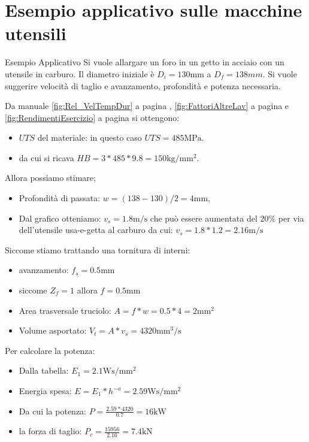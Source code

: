 
\chapter{Esempio applicativo sulle macchine utensili}
\label{exe:EsempioApplicativo}

\begin{example}{Esempio Applicativo}
Si vuole allargare un foro in un getto in acciaio con un utensile in carburo. Il diametro iniziale è $D_i = 130\unit{\mm}$ a $D_f = 138\unit{mm}$. Si vuole suggerire velocità di taglio e avanzamento, profondità e potenza necessaria.

Da manuale \eqref{fig:Rel_VelTempDur} a pagina \pageref{fig:Rel_VelTempDur}, \eqref{fig:FattoriAltreLav} a pagina \pageref{fig:FattoriAltreLav} e \eqref{fig:RendimentiEsercizio}  a pagina \pageref{fig:RendimentiEsercizio} si ottengono: 
\begin{itemize}
\item $UTS$ del materiale: in questo caso $UTS = 485\unit{\MPa}$.
\item da cui si ricava $HB = 3*485*9.8=150\unit{\kg/\mm^2}$.
\end{itemize}
Allora possiamo stimare;
\begin{itemize}
\item Profondità di passata: $w = (138-130)/2 = 4\unit{\mm}$,
\item Dal grafico otteniamo: $v_s = 1.8\unit{\m/\s}$ che può essere aumentata del 20\% per via dell'utensile usa-e-getta al carburo da cui: $v_s = 1.8 * 1.2 = 2.16\unit{\m/\s}$
\end{itemize}
Siccome stiamo trattando una tornitura di interni:
\begin{itemize}
\item avanzamento: $f_s = 0.5\unit{\mm}$
\item siccome $Z_f = 1$ allora $f = 0.5\unit{\mm}$
\item Area trasversale truciolo: $A = f*w = 0.5*4 = 2\unit{\mm^2}$
\item Volume asportato: $V_t = A * v_s = 4320\unit{\mm^3/\s}$
\end{itemize}
Per calcolare la potenza:
\begin{itemize}
\item Dalla tabella: $E_1 = 2.1\unit{\W\s/\mm^2}$
\item Energia spesa: $E = E_1 * h^{-a}= 2.59\unit{\W\s/\mm^2}$
\item Da cui la potenza: $P = \frac{2.59 * 4320}{0.7} = 16\unit{\kW}$
\item la forza di taglio: $P_c = \frac{15956}{2.16} = 7.4\unit{\kN}$
\end{itemize}
\end{example}

